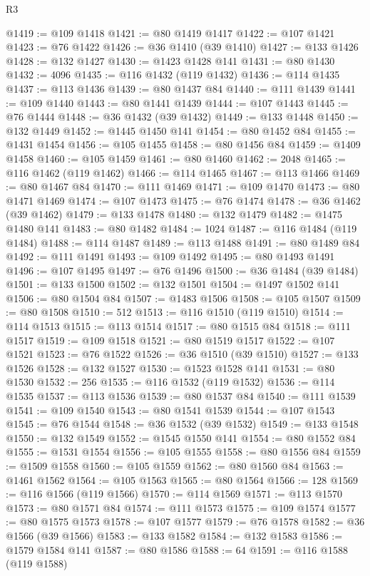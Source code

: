 \begin{lexlean}{R3}
\begin{coremodule}
@1419 := @109 @1418
@1421 := @80 @1419 @1417
@1422 := @107 @1421
@1423 := @76 @1422
@1426 := @36 @1410 (@39 @1410)
@1427 := @133 @1426
@1428 := @132 @1427
@1430 := @1423 @1428 @141
@1431 := @80 @1430
@1432 := 4096
@1435 := @116 @1432 (@119 @1432)
@1436 := @114 @1435
@1437 := @113 @1436
@1439 := @80 @1437 @84
@1440 := @111 @1439
@1441 := @109 @1440
@1443 := @80 @1441 @1439
@1444 := @107 @1443
@1445 := @76 @1444
@1448 := @36 @1432 (@39 @1432)
@1449 := @133 @1448
@1450 := @132 @1449
@1452 := @1445 @1450 @141
@1454 := @80 @1452 @84
@1455 := @1431 @1454
@1456 := @105 @1455
@1458 := @80 @1456 @84
@1459 := @1409 @1458
@1460 := @105 @1459
@1461 := @80 @1460
@1462 := 2048
@1465 := @116 @1462 (@119 @1462)
@1466 := @114 @1465
@1467 := @113 @1466
@1469 := @80 @1467 @84
@1470 := @111 @1469
@1471 := @109 @1470
@1473 := @80 @1471 @1469
@1474 := @107 @1473
@1475 := @76 @1474
@1478 := @36 @1462 (@39 @1462)
@1479 := @133 @1478
@1480 := @132 @1479
@1482 := @1475 @1480 @141
@1483 := @80 @1482
@1484 := 1024
@1487 := @116 @1484 (@119 @1484)
@1488 := @114 @1487
@1489 := @113 @1488
@1491 := @80 @1489 @84
@1492 := @111 @1491
@1493 := @109 @1492
@1495 := @80 @1493 @1491
@1496 := @107 @1495
@1497 := @76 @1496
@1500 := @36 @1484 (@39 @1484)
@1501 := @133 @1500
@1502 := @132 @1501
@1504 := @1497 @1502 @141
@1506 := @80 @1504 @84
@1507 := @1483 @1506
@1508 := @105 @1507
@1509 := @80 @1508
@1510 := 512
@1513 := @116 @1510 (@119 @1510)
@1514 := @114 @1513
@1515 := @113 @1514
@1517 := @80 @1515 @84
@1518 := @111 @1517
@1519 := @109 @1518
@1521 := @80 @1519 @1517
@1522 := @107 @1521
@1523 := @76 @1522
@1526 := @36 @1510 (@39 @1510)
@1527 := @133 @1526
@1528 := @132 @1527
@1530 := @1523 @1528 @141
@1531 := @80 @1530
@1532 := 256
@1535 := @116 @1532 (@119 @1532)
@1536 := @114 @1535
@1537 := @113 @1536
@1539 := @80 @1537 @84
@1540 := @111 @1539
@1541 := @109 @1540
@1543 := @80 @1541 @1539
@1544 := @107 @1543
@1545 := @76 @1544
@1548 := @36 @1532 (@39 @1532)
@1549 := @133 @1548
@1550 := @132 @1549
@1552 := @1545 @1550 @141
@1554 := @80 @1552 @84
@1555 := @1531 @1554
@1556 := @105 @1555
@1558 := @80 @1556 @84
@1559 := @1509 @1558
@1560 := @105 @1559
@1562 := @80 @1560 @84
@1563 := @1461 @1562
@1564 := @105 @1563
@1565 := @80 @1564
@1566 := 128
@1569 := @116 @1566 (@119 @1566)
@1570 := @114 @1569
@1571 := @113 @1570
@1573 := @80 @1571 @84
@1574 := @111 @1573
@1575 := @109 @1574
@1577 := @80 @1575 @1573
@1578 := @107 @1577
@1579 := @76 @1578
@1582 := @36 @1566 (@39 @1566)
@1583 := @133 @1582
@1584 := @132 @1583
@1586 := @1579 @1584 @141
@1587 := @80 @1586
@1588 := 64
@1591 := @116 @1588 (@119 @1588)

\end{coremodule}
\end{lexlean}
